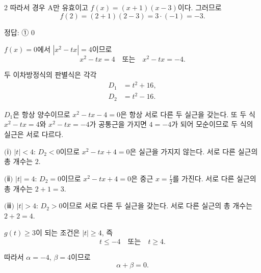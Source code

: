 \documentclass[10pt]{article}
\begin{document}
\begin{multicols}{2}
따라서 경우 A만 유효이고 $f(x) = (x + 1)(x - 3)$이다. 그러므로
\[ f(2) = (2 + 1)(2 - 3) = 3 \cdot (-1) = -3. \]

\begin{answerbox}정답: ① $0$\end{answerbox}

$f(x) = 0$에서 $|x^2 - tx| = 4$이므로
\[ x^2 - tx = 4 \quad \text{또는} \quad x^2 - tx = -4. \]

두 이차방정식의 판별식은 각각
\begin{align*}
D_1 &= t^2 + 16, \\
D_2 &= t^2 - 16.
\end{align*}

$D_1$은 항상 양수이므로 $x^2 - tx - 4 = 0$은 항상 서로 다른 두 실근을 갖는다. 또 두 식 $x^2 - tx = 4$와 $x^2 - tx = -4$가 공통근을 가지면 $4 = -4$가 되어 모순이므로 두 식의 실근은 서로 다르다.

$(\!$ⅰ$)$ $|t| < 4$: $D_2 < 0$이므로 $x^2 - tx + 4 = 0$은 실근을 가지지 않는다. 서로 다른 실근의 총 개수는 $2$.

$(\!$ⅱ$)$ $|t| = 4$: $D_2 = 0$이므로 $x^2 - tx + 4 = 0$은 중근 $x = \tfrac{t}{2}$를 가진다. 서로 다른 실근의 총 개수는 $2 + 1 = 3$.

$(\!$ⅲ$)$ $|t| > 4$: $D_2 > 0$이므로 서로 다른 두 실근을 갖는다. 서로 다른 실근의 총 개수는 $2 + 2 = 4$.

$g(t) \ge 3$이 되는 조건은 $|t| \ge 4$, 즉
\[ t \le -4 \quad \text{또는} \quad t \ge 4. \]

따라서 $\alpha = -4$, $\beta = 4$이므로
\[ \alpha + \beta = 0. \]

\end{multicols}
\end{document}
